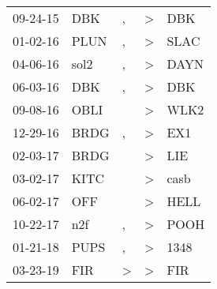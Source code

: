 \begin{supertabular}{p{0.07\textwidth}p{0.06\textwidth}p{0.02\textwidth}p{0.02\textwidth}p{0.06\textwidth}}
          09-24-15\textsuperscript{} &   DBK\textsuperscript{} &             , &     \textgreater &   DBK\textsuperscript{} \\
          01-02-16\textsuperscript{} &  PLUN\textsuperscript{} &             , &     \textgreater &  SLAC\textsuperscript{} \\
          04-06-16\textsuperscript{} &  sol2\textsuperscript{} &             , &     \textgreater &  DAYN\textsuperscript{} \\
          06-03-16\textsuperscript{} &   DBK\textsuperscript{} &             , &     \textgreater &   DBK\textsuperscript{} \\
          09-08-16\textsuperscript{} &  OBLI\textsuperscript{} &               &     \textgreater &  WLK2\textsuperscript{} \\
          12-29-16\textsuperscript{} &  BRDG\textsuperscript{} &             , &     \textgreater &   EX1\textsuperscript{} \\
          02-03-17\textsuperscript{} &  BRDG\textsuperscript{} &               &     \textgreater &   LIE\textsuperscript{} \\
          03-02-17\textsuperscript{} &  KITC\textsuperscript{} &               &     \textgreater &  casb\textsuperscript{} \\
          06-02-17\textsuperscript{} &   OFF\textsuperscript{} &               &     \textgreater &  HELL\textsuperscript{} \\
          10-22-17\textsuperscript{} &   n2f\textsuperscript{} &             , &     \textgreater &  POOH\textsuperscript{} \\
          01-21-18\textsuperscript{} &  PUPS\textsuperscript{} &             , &     \textgreater &  1348\textsuperscript{} \\
          03-23-19\textsuperscript{} &   FIR\textsuperscript{} &  \textgreater &     \textgreater &   FIR\textsuperscript{} \\
\end{supertabular}

